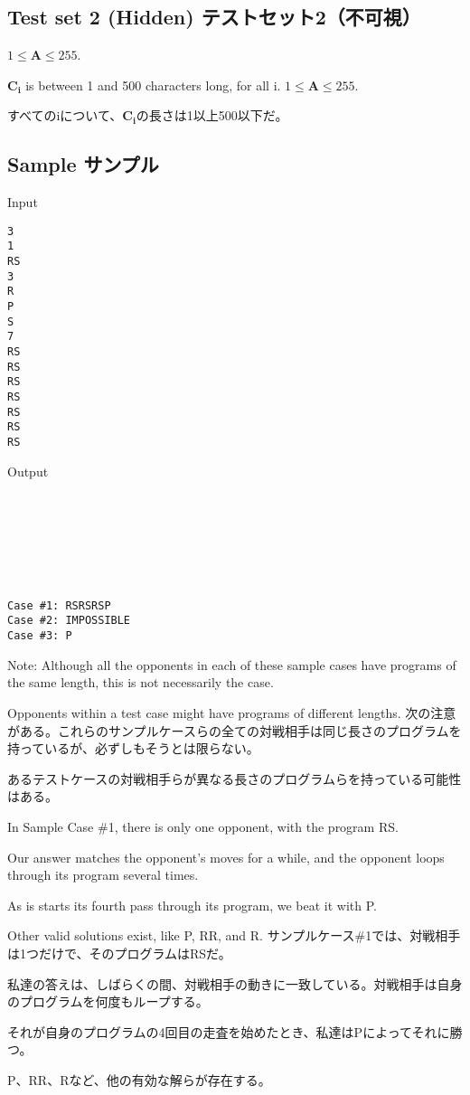 \documentclass[uplatex,dvipdfmx]{jsarticle} \usepackage{amsmath,amssymb,bm}
\begin{document}
\subsection*{Test set 2 (Hidden) テストセット2（不可視）}
\begin{paracol}{2}
$1 \leq \mathbf{A} \leq 255$.

$\mathbf{C_i}$ is between 1 and 500 characters long, for all i.
\switchcolumn
$1 \leq \mathbf{A} \leq 255$.

すべてのiについて、$\mathbf{C_i}$の長さは1以上500以下だ。
\end{paracol}
\subsection*{Sample サンプル}
\begin{paracol}{2}
Input
\begin{verbatim}
3
1
RS
3
R
P
S
7
RS
RS
RS
RS
RS
RS
RS
\end{verbatim}
\switchcolumn
Output
\begin{verbatim}







Case #1: RSRSRSP
Case #2: IMPOSSIBLE
Case #3: P
\end{verbatim}
\end{paracol}
\vspace{\baselineskip}
\begin{paracol}{2}
Note: Although all the opponents in each of these sample cases have programs of the same length, this is not necessarily the case.

Opponents within a test case might have programs of different lengths.
\switchcolumn
次の注意がある。これらのサンプルケースらの全ての対戦相手は同じ長さのプログラムを持っているが、必ずしもそうとは限らない。

あるテストケースの対戦相手らが異なる長さのプログラムらを持っている可能性はある。
\end{paracol}
\vspace{\baselineskip}
\begin{paracol}{2}
In Sample Case \#1, there is only one opponent, with the program RS.

Our answer matches the opponent's moves for a while, and the opponent loops through its program several times.

As is starts its fourth pass through its program, we beat it with P.

Other valid solutions exist, like P, RR, and R.
\switchcolumn
サンプルケース\#1では、対戦相手は1つだけで、そのプログラムはRSだ。

私達の答えは、しばらくの間、対戦相手の動きに一致している。対戦相手は自身のプログラムを何度もループする。

それが自身のプログラムの4回目の走査を始めたとき、私達はPによってそれに勝つ。

P、RR、Rなど、他の有効な解らが存在する。
\end{paracol}
\end{document}
